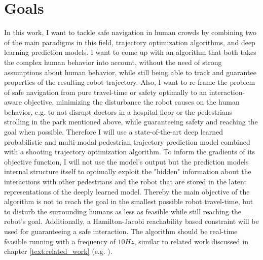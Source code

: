 \section{Goals}
\label{text:introduction/goals}
In this work, I want to tackle safe navigation in human crowds by combining two of the main paradigms in this field, trajectory optimization algorithms, and deep learning prediction models. I want to come up with an algorithm that both takes the complex human behavior into account, without the need of strong assumptions about human behavior, while still being able to track and guarantee properties of the resulting robot trajectory. Also, I want to re-frame the problem of safe navigation from pure travel-time or safety optimally to an interaction-aware objective, minimizing the disturbance the robot causes on the human behavior, e.g. to not disrupt doctors in a hospital floor or the pedestrians strolling in the park mentioned above, while guaranteeing safety and reaching the goal when possible.
\newline
Therefore I will use a state-of-the-art deep learned probabilistic and multi-modal pedestrian trajectory prediction model combined with a shooting trajectory optimization algorithm. To inform the gradients of its objective function, I will not use the model's output but the prediction models internal structure itself to optimally exploit the "hidden" information about the interactions with other pedestrians and the robot that are stored in the latent representations of the deeply learned model. Thereby the main objective of the algorithm is not to reach the goal in the smallest possible robot travel-time, but to disturb the surrounding humans as less as feasible while still reaching the robot's goal. Additionally, a Hamilton-Jacobi reachability based constraint will be used for guaranteeing a safe interaction. The algorithm should be real-time feasible running with a frequency of $10 Hz$, similar to related work discussed in chapter \ref{text:related_work} (e.g. \cite{Chen2017}).


